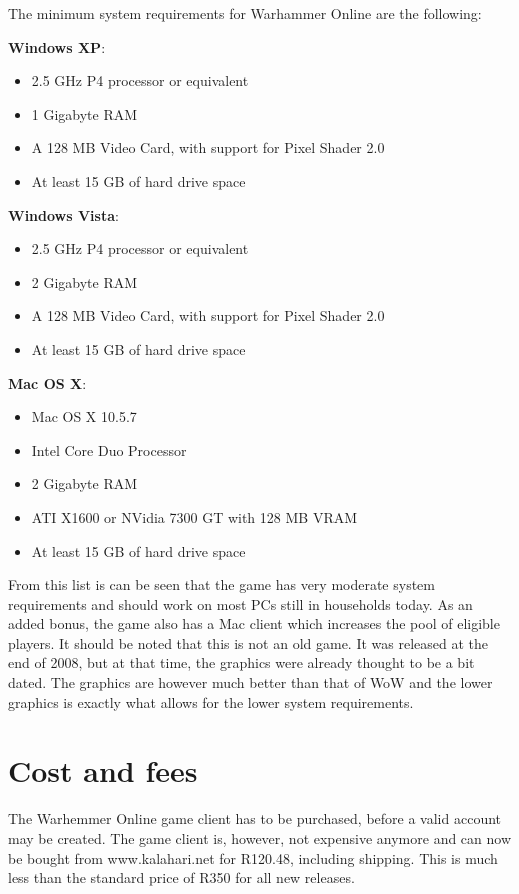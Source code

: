 \documentclass[journal,oneside,a4paper,onecolumn]{IEEEtran}
\begin{document}
The minimum system requirements for Warhammer Online are the following:

\textbf{Windows XP}:
\begin{itemize}
    \item 2.5 GHz P4 processor or equivalent
    \item 1 Gigabyte RAM
    \item A 128 MB Video Card, with support for Pixel Shader 2.0
    \item At least 15 GB of hard drive space
\end{itemize}

\textbf{Windows Vista}:
\begin{itemize}
    \item 2.5 GHz P4 processor or equivalent
    \item 2 Gigabyte RAM
    \item A 128 MB Video Card, with support for Pixel Shader 2.0
    \item At least 15 GB of hard drive space
\end{itemize}

\textbf{Mac OS X}:
\begin{itemize}
    \item Mac OS X 10.5.7
    \item Intel Core Duo Processor
    \item 2 Gigabyte RAM
    \item ATI X1600 or NVidia 7300 GT with 128 MB VRAM
    \item At least 15 GB of hard drive space
\end{itemize}

From this list is can be seen that the game has very moderate system requirements and should work on most PCs still in households today. As an added
bonus, the game also has a Mac client which increases the pool of eligible players. It should be noted that this is not an old game. It was released
at the end of 2008, but at that time, the graphics were already thought to be a bit dated. The graphics are however much better than that of \ac{WoW}
and the lower graphics is exactly what allows for the lower system requirements.

\section{Cost and fees}

The Warhemmer Online game client has to be purchased, before a valid account may be created. The game client is, however, not expensive anymore and
can now be bought from www.kalahari.net for R120.48, including shipping. This is much less than the standard price of R350 for all new releases.
\end{document}
